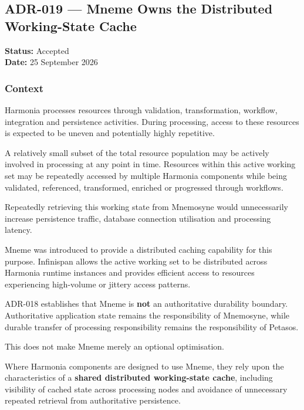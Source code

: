 
\subsection{ADR-019 --- Mneme Owns the Distributed Working-State Cache}
\label{adr:019-mneme-distributed-working-state-cache}

\textbf{Status:} Accepted\\
\textbf{Date:} 25 September 2026

\subsubsection{Context}

Harmonia processes resources through validation, transformation, workflow, integration and persistence activities. During processing, access to these resources is expected to be uneven and potentially highly repetitive.

A relatively small subset of the total resource population may be actively involved in processing at any point in time. Resources within this active working set may be repeatedly accessed by multiple Harmonia components while being validated, referenced, transformed, enriched or progressed through workflows.

Repeatedly retrieving this working state from Mnemosyne would unnecessarily increase persistence traffic, database connection utilisation and processing latency.

Mneme was introduced to provide a distributed caching capability for this purpose. Infinispan allows the active working set to be distributed across Harmonia runtime instances and provides efficient access to resources experiencing high-volume or jittery access patterns.

ADR-018 establishes that Mneme is \textbf{not} an authoritative durability boundary. Authoritative application state remains the responsibility of Mnemosyne, while durable transfer of processing responsibility remains the responsibility of Petasos.

This does not make Mneme merely an optional optimisation.

Where Harmonia components are designed to use Mneme, they rely upon the characteristics of a \textbf{shared distributed working-state cache}, including visibility of cached state across processing nodes and avoidance of unnecessary repeated retrieval from authoritative persistence.

